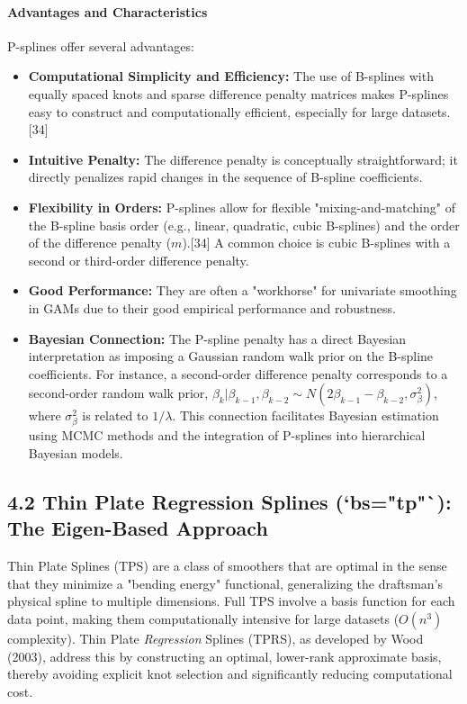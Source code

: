 \documentclass[11pt, a4paper]{article}
\begin{document}
\paragraph{Advantages and Characteristics}
P-splines offer several advantages:
\begin{itemize}
 \item \textbf{Computational Simplicity and Efficiency:} The use of B-splines with equally spaced knots and sparse difference penalty matrices makes P-splines easy to construct and computationally efficient, especially for large datasets.[34]
 \item \textbf{Intuitive Penalty:} The difference penalty is conceptually straightforward; it directly penalizes rapid changes in the sequence of B-spline coefficients.
 \item \textbf{Flexibility in Orders:} P-splines allow for flexible "mixing-and-matching" of the B-spline basis order (e.g., linear, quadratic, cubic B-splines) and the order of the difference penalty ($m$).[34] A common choice is cubic B-splines with a second or third-order difference penalty.
 \item \textbf{Good Performance:} They are often a "workhorse" for univariate smoothing in GAMs due to their good empirical performance and robustness.
 \item \textbf{Bayesian Connection:} The P-spline penalty has a direct Bayesian interpretation as imposing a Gaussian random walk prior on the B-spline coefficients. For instance, a second-order difference penalty corresponds to a second-order random walk prior, $ \beta_k | \beta_{k-1}, \beta_{k-2} \sim N(2\beta_{k-1} - \beta_{k-2}, \sigma_\beta^2) $, where $\sigma_\beta^2$ is related to $1/\lambda$. This connection facilitates Bayesian estimation using MCMC methods and the integration of P-splines into hierarchical Bayesian models.
\end{itemize}


\subsection{4.2 Thin Plate Regression Splines (`bs="tp"`): The Eigen-Based Approach}
Thin Plate Splines (TPS) are a class of smoothers that are optimal in the sense that they minimize a "bending energy" functional, generalizing the draftsman's physical spline to multiple dimensions. Full TPS involve a basis function for each data point, making them computationally intensive for large datasets ($O(n^3)$ complexity). Thin Plate \textit{Regression} Splines (TPRS), as developed by Wood (2003), address this by constructing an optimal, lower-rank approximate basis, thereby avoiding explicit knot selection and significantly reducing computational cost.
\end{document}
